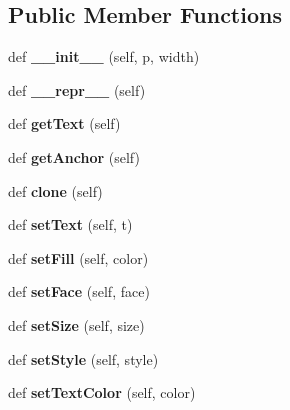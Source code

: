 \subsection*{Public Member Functions}
\begin{DoxyCompactItemize}
\item 
\mbox{\label{classgraphics_1_1_entry_afb968169b4da90b66fd7cc34ffe8d93a}} 
def {\bfseries \+\_\+\+\_\+init\+\_\+\+\_\+} (self, p, width)
\item 
\mbox{\label{classgraphics_1_1_entry_aea5b15bc4da7ede46e7cdd9991748c9e}} 
def {\bfseries \+\_\+\+\_\+repr\+\_\+\+\_\+} (self)
\item 
\mbox{\label{classgraphics_1_1_entry_a0a09f97f04f3d54bf8a5ca3edf99ef19}} 
def {\bfseries get\+Text} (self)
\item 
\mbox{\label{classgraphics_1_1_entry_ab0a6e815195a49e1e682eb94d4735c9e}} 
def {\bfseries get\+Anchor} (self)
\item 
\mbox{\label{classgraphics_1_1_entry_a15f95f96006286fead5e136792932434}} 
def {\bfseries clone} (self)
\item 
\mbox{\label{classgraphics_1_1_entry_a6a8f8c6cbc38f8efabe66785f09c735c}} 
def {\bfseries set\+Text} (self, t)
\item 
\mbox{\label{classgraphics_1_1_entry_ad1d04de2ffd36b0b6d6733fe992303ee}} 
def {\bfseries set\+Fill} (self, color)
\item 
\mbox{\label{classgraphics_1_1_entry_abaaf60215354bfbcecbd506e7176d54b}} 
def {\bfseries set\+Face} (self, face)
\item 
\mbox{\label{classgraphics_1_1_entry_a0e4a339c1fa89e228f750b7d5c6d8ced}} 
def {\bfseries set\+Size} (self, size)
\item 
\mbox{\label{classgraphics_1_1_entry_aa36a5f9e71331b921f0728c25631d9c3}} 
def {\bfseries set\+Style} (self, style)
\item 
\mbox{\label{classgraphics_1_1_entry_a44e4c12f4ec190351fc8dc29bf7f0a37}} 
def {\bfseries set\+Text\+Color} (self, color)
\end{DoxyCompactItemize}
